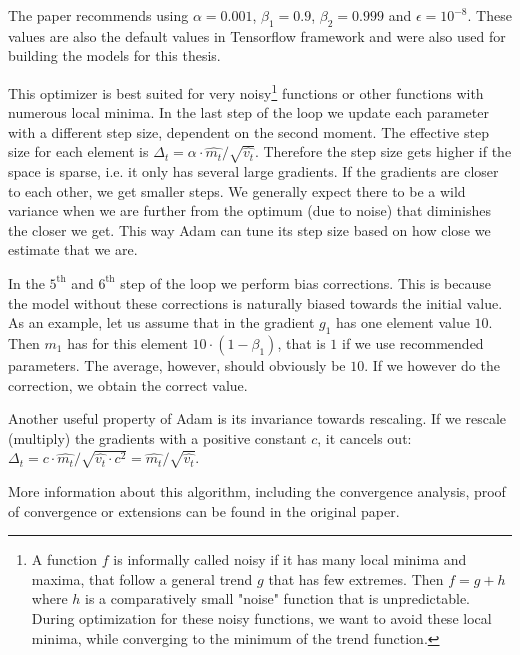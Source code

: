 The paper recommends using $\alpha = 0.001$, $\beta_1=0.9$, $\beta_2=0.999$ and $\epsilon=10^{-8}$. These values are also the default values in Tensorflow framework and were also used for building the models for this thesis.

This optimizer is best suited for very noisy\footnote{A function $f$ is informally called noisy if it has many local minima and maxima, that follow a general trend $g$ that has few extremes. Then $f=g+h$ where $h$ is a comparatively small "noise" function that is unpredictable. During optimization for these noisy functions, we want to avoid these local minima, while converging to the minimum of the trend function.} functions or other functions with numerous local minima. In the last step of the loop we update each parameter with a different step size, dependent on the second moment. The effective step size for each element is $\Delta_t=\alpha\cdot\widehat{m_t}/\sqrt{\widehat{v_t}}$. Therefore the step size gets higher if the space is sparse, i.e. it only has several large gradients. If the gradients are closer to each other, we get smaller steps. We generally expect there to be a wild variance when we are further from the optimum (due to noise) that diminishes the closer we get. This way Adam can tune its step size based on how close we estimate that we are. 

In the $5^\text{th}$ and $6^\text{th}$ step of the loop we perform bias corrections. This is because the model without these corrections is naturally biased towards the initial value. As an example, let us assume that in the gradient $g_1$ has one element value $10$. Then $m_1$ has for this element $10\cdot(1-\beta_1)$, that is $1$ if we use recommended parameters. The average, however, should obviously be $10$. If we however do the correction, we obtain the correct value.

Another useful property of Adam is its invariance towards rescaling. If we rescale (multiply) the gradients with a positive constant $c$, it cancels out: $\Delta_t = c\cdot\widehat{m_t}/\sqrt{\widehat{v_t}\cdot c^2}=\widehat{m_t}/\sqrt{\widehat{v_t}}$.

More information about this algorithm, including the convergence analysis, proof of convergence or extensions can be found in the original paper.